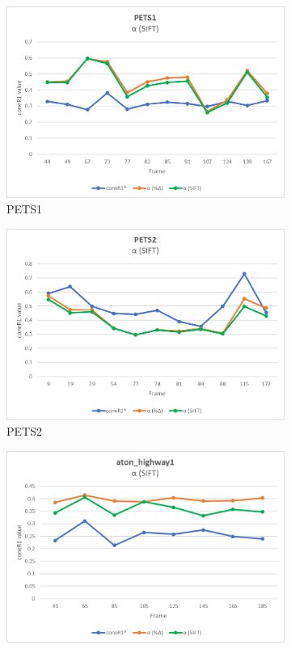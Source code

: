 \begin{appendices}
\clearpage
\FloatBarrier
\begin{figure}
  \begin{subfigure}{.45\linewidth}
  \includegraphics[width=1\linewidth]{figures/appendix/pets1_sift.jpg}
  \caption{PETS1}
\end{subfigure}
\hfill
\begin{subfigure}{.45\linewidth}
  \includegraphics[width=1\linewidth]{figures/appendix/pets2_sift.jpg}
  \caption{PETS2}
\end{subfigure}
\hfill
\begin{subfigure}{.45\linewidth}
  \includegraphics[width=1\linewidth]{figures/appendix/highway1_sift.jpg}

\end{subfigure}
\end{figure}
\end{appendices}
